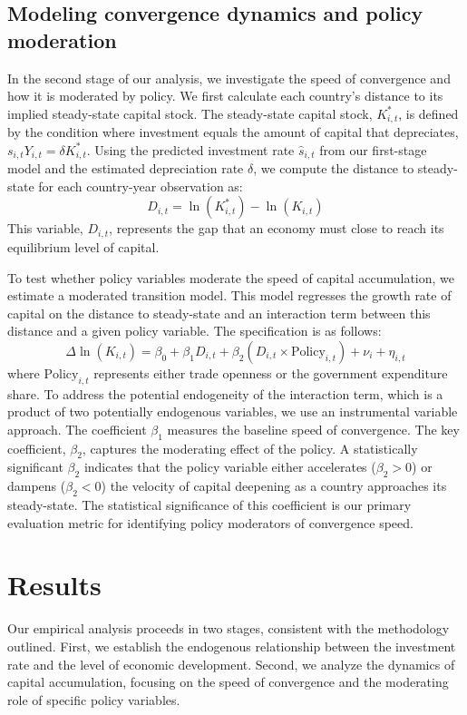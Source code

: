 \documentclass[]{article}
\begin{document}
\subsection{Modeling convergence dynamics and policy moderation}
In the second stage of our analysis, we investigate the speed of convergence and how it is moderated by policy. We first calculate each country's distance to its implied steady-state capital stock. The steady-state capital stock, $K^*_{i,t}$, is defined by the condition where investment equals the amount of capital that depreciates, $s_{i,t}Y_{i,t} = \delta K^*_{i,t}$. Using the predicted investment rate $\hat{s}_{i,t}$ from our first-stage model and the estimated depreciation rate $\delta$, we compute the distance to steady-state for each country-year observation as:
\begin{equation}
D_{i,t} = \ln(K^*_{i,t}) - \ln(K_{i,t})
\end{equation}
This variable, $D_{i,t}$, represents the gap that an economy must close to reach its equilibrium level of capital.

To test whether policy variables moderate the speed of capital accumulation, we estimate a moderated transition model. This model regresses the growth rate of capital on the distance to steady-state and an interaction term between this distance and a given policy variable. The specification is as follows:
\begin{equation}
\Delta \ln(K_{i,t}) = \beta_0 + \beta_1 D_{i,t} + \beta_2 (D_{i,t} \times \text{Policy}_{i,t}) + \nu_i + \eta_{i,t}
\end{equation}
where $\text{Policy}_{i,t}$ represents either trade openness or the government expenditure share. To address the potential endogeneity of the interaction term, which is a product of two potentially endogenous variables, we use an instrumental variable approach. The coefficient $\beta_1$ measures the baseline speed of convergence. The key coefficient, $\beta_2$, captures the moderating effect of the policy. A statistically significant $\beta_2$ indicates that the policy variable either accelerates ($\beta_2 > 0$) or dampens ($\beta_2 < 0$) the velocity of capital deepening as a country approaches its steady-state. The statistical significance of this coefficient is our primary evaluation metric for identifying policy moderators of convergence speed.

\section{Results}
\label{sec:results}
Our empirical analysis proceeds in two stages, consistent with the methodology outlined. First, we establish the endogenous relationship between the investment rate and the level of economic development. Second, we analyze the dynamics of capital accumulation, focusing on the speed of convergence and the moderating role of specific policy variables.
\end{document}
